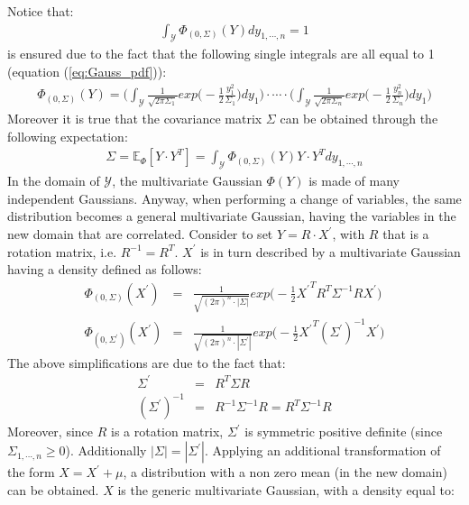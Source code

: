 \documentclass{article}
\begin{document}
Notice that:
\begin{eqnarray}
\int_{\mathcal{Y}} \Phi_{(0, \Sigma)}(Y) dy_{1,\cdots,n} = 1
\end{eqnarray}
is ensured due to the fact that the following single integrals are all equal to 1 (equation (\ref{eq:Gauss_pdf})):
\begin{eqnarray}
\Phi_{(0, \Sigma)}(Y) = \bigg( \int_{\mathcal{Y}} \frac{1}{\sqrt{2 \pi \Sigma_1}} exp \bigg( -\frac{1}{2} \frac{y_1^2}{\Sigma_1}  \bigg) dy_1 \bigg) \cdot \cdots \cdot \bigg( \int_{\mathcal{Y}} \frac{1}{\sqrt{2 \pi \Sigma_n}} exp \bigg( -\frac{1}{2} \frac{y_n^2}{\Sigma_n}  \bigg) dy_1 \bigg)
\end{eqnarray}
Moreover it is true that the covariance matrix $\Sigma$ can be obtained through the following expectation:
\begin{eqnarray}
\Sigma = \mathbb{E}_{\Phi} [ Y \cdot Y^T ] = \int _{\mathcal{Y}} \Phi_{(0,\Sigma)}(Y) Y\cdot Y^T dy_{1,\cdots,n}
\end{eqnarray}
In the domain of $\mathcal{Y}$, the multivariate Gaussian $\Phi(Y)$ is made of many independent Gaussians. Anyway, when performing a change of variables, the same distribution becomes a general multivariate Gaussian, having the variables in the new domain that are correlated. Consider to set $Y=R \cdot X^{'}$, with $R$ that is a rotation matrix, i.e. $R^{-1} = R^T$.  $X^{'}$ is in turn described by a multivariate Gaussian having a density defined as follows:
\begin{eqnarray}
\Phi_{(0, \Sigma)}(X^{'}) &=& \frac{1}{\sqrt{ {(2 \pi)}^n \cdot \left | \Sigma \right | }  } exp \bigg( -\frac{1}{2} {X^{'}}^T R^T \Sigma^{-1} R X^{'} \bigg) \\
\Phi_{(0, \Sigma^{'})}(X^{'}) &=& \frac{1}{\sqrt{ {(2 \pi)}^n \cdot \left | \Sigma^{'} \right | }  } exp \bigg( -\frac{1}{2} {X^{'}}^T ({\Sigma^{'}})^{-1} X^{'} \bigg)
\end{eqnarray} 
The above simplifications are due to the fact that:
\begin{eqnarray}
\Sigma^{'} &=& R^T \Sigma R \\
({\Sigma^{'}})^{-1} &=& R^{-1} \Sigma^{-1} R = R^T \Sigma^{-1} R 
\end{eqnarray}
Moreover, since $R$ is a rotation matrix, $\Sigma^{'}$ is symmetric positive definite (since $\Sigma_{1,\cdots,n} \geq 0$). Additionally $\left | \Sigma \right | = \left | \Sigma^{'} \right |$. 
Applying an additional transformation of the form $X = X^{'} + \mu$, a distribution with a non zero mean (in the new domain) can be obtained. $X$ is the generic multivariate Gaussian, with a density equal to:
\end{document}
